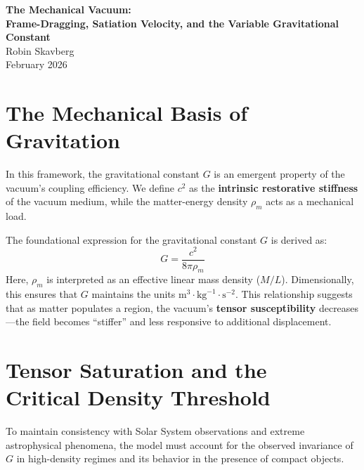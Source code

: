\documentclass[12pt,a4paper]{article}
\begin{document}
\begin{center}
    \large \textbf{The Mechanical Vacuum: \\ Frame-Dragging, Satiation Velocity, and the Variable Gravitational Constant} \\
    \vspace{1em}
    \normalsize Robin Skavberg \\
    \normalsize February 2026
\end{center}

\begin{abstract}
Standard General Relativity (GR) treats $G$ as a static scalar constant. This paper proposes an \textbf{Equilibrium Perspective}, wherein $G$ represents the dynamic restorative response of the vacuum field. We derive $G$ as a function of vacuum restorative stiffness and matter-energy density $\rho_m$. By defining a state of \textbf{Mechanical Satiation}, we provide a physical basis for the Newtonian limit and the behavior of high-density singularities, while offering a mechanical framework that complements and expands upon the dark matter paradigm in low-density galactic halos. 
\end{abstract}

\section{The Mechanical Basis of Gravitation}
In this framework, the gravitational constant $G$ is an emergent property of the vacuum's coupling efficiency. We define $c^2$ as the \textbf{intrinsic restorative stiffness} of the vacuum medium, while the matter-energy density $\rho_m$ acts as a mechanical load.

The foundational expression for the gravitational constant $G$ is derived as:
\begin{equation}
G = \frac{c^2}{8\pi\rho_m}
\end{equation}
Here, $\rho_m$ is interpreted as an effective linear mass density ($M/L$). Dimensionally, this ensures that $G$ maintains the units $\text{m}^3 \cdot \text{kg}^{-1} \cdot \text{s}^{-2}$. This relationship suggests that as matter populates a region, the vacuum's \textbf{tensor susceptibility} decreases—the field becomes ``stiffer'' and less responsive to additional displacement.

\section{Tensor Saturation and the \\ Critical Density Threshold}
To maintain consistency with Solar System observations and extreme astrophysical phenomena, the model must account for the observed invariance of $G$ in high-density regimes and its behavior in the presence of compact objects.
\end{document}
